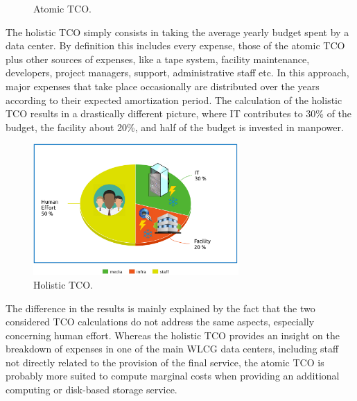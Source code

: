 \begin{figure}[h]
    \caption{Atomic TCO.}
    \label{fig:tco:atomic}
\end{figure}



The holistic TCO simply consists in taking the average yearly budget
spent by a data center.  By definition this includes every expense,
those of the atomic TCO plus other sources of expenses, like a tape
system, facility maintenance, developers, project managers, support,
administrative staff etc.  In this approach, major expenses that take
place occasionally are distributed over the years according to their
expected amortization period.  The calculation of the holistic TCO
results in a drastically different picture, where IT contributes to
30\% of the budget, the facility about 20\%, and half of the budget
is invested in manpower.

\begin{figure}[h]
    \centering
    \includegraphics[height=5cm]{holistic_tco.png}
    \caption{Holistic TCO.}
    \label{fig:tco:holistic}
\end{figure}


The difference in the results is mainly explained by the fact that the
two considered TCO calculations do not address the same aspects,
especially concerning human effort. Whereas the holistic TCO provides
an insight on the breakdown of expenses in one of the main WLCG data
centers, including staff not directly related to the provision of the
final service, the atomic TCO is probably more suited to compute
marginal costs when providing an additional computing or disk-based
storage service.



